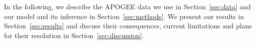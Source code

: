 \documentclass[a4paper,fleqn,usenatbib]{mnras}
\begin{document}
In the following, we describe the APOGEE data we use in Section~\ref{sec:data} and our model and its inference in Section~\ref{sec:methods}. We present our results in Section~\ref{sec:results} and discuss their consequences, current limitations and plans for their resolution in Section~\ref{sec:discussion}.












\end{document}
